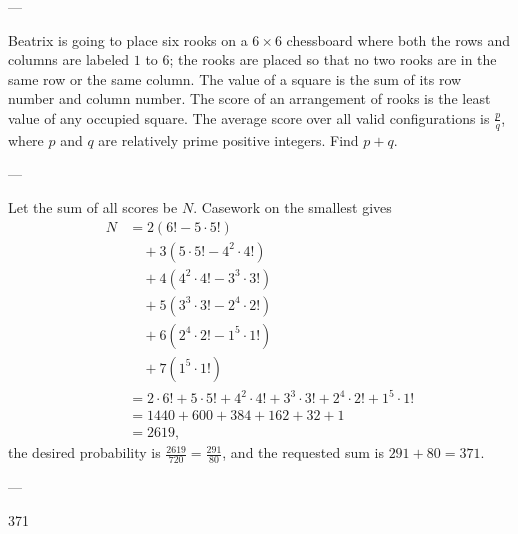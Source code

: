 
---

Beatrix is going to place six rooks on a $6\times6$ chessboard where both the rows and columns are labeled $1$ to $6$; the rooks are placed so that no two rooks are in the same row or the same column. The value of a square is the sum of its row number and column number. The score of an arrangement of rooks is the least value of any occupied square. The average score over all valid configurations is $\tfrac{p}{q}$, where $p$ and $q$ are relatively prime positive integers. Find $p+q$.

---

Let the sum of all scores be $N$. Casework on the smallest gives
\begin{align*}
    N&=2(6!-5\cdot 5!)\\
    &\quad+3(5\cdot 5!-4^2\cdot 4!)\\
    &\quad+4(4^2\cdot 4!-3^3\cdot 3!)\\
    &\quad+5(3^3\cdot 3!-2^4\cdot 2!)\\
    &\quad+6(2^4\cdot 2!-1^5\cdot 1!)\\
    &\quad+7(1^5\cdot 1!)\\
    &=2\cdot 6!+5\cdot 5!+4^2\cdot 4!+3^3\cdot 3!+2^4\cdot 2!+1^5\cdot 1!\\
    &=1440+600+384+162+32+1\\
    &=2619,
\end{align*}
the desired probability is $\frac{2619}{720}=\frac{291}{80}$, and the requested sum is $291+80=371$.

---

371

